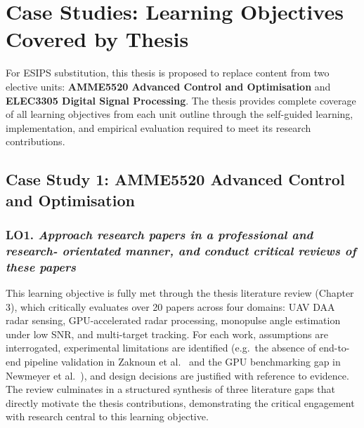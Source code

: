 \section*{Case Studies: Learning Objectives Covered by Thesis}

For ESIPS substitution, this thesis is proposed to replace content from two elective
units: \textbf{AMME5520 Advanced Control and Optimisation} and \textbf{ELEC3305 Digital
Signal Processing}. The thesis provides complete coverage of all learning objectives from
each unit outline through the self-guided learning, implementation, and empirical
evaluation required to meet its research contributions.

\subsection*{Case Study 1: AMME5520 Advanced Control and Optimisation}

\subsubsection*{LO1. \emph{Approach research papers in a professional and research-
orientated manner, and conduct critical reviews of these papers}}
This learning objective is fully met through the thesis literature review (Chapter 3),
which critically evaluates over 20 papers across four domains: UAV DAA radar sensing,
GPU-accelerated radar processing, monopulse angle estimation under low SNR, and
multi-target tracking. For each work, assumptions are interrogated, experimental
limitations are identified (e.g.\ the absence of end-to-end pipeline validation in
Zaknoun et al.\ \cite{zaknoun2024_realtime_gpu_accelerated_radar_processing} 
and the GPU benchmarking gap in Newmeyer et al.\ \cite{7577322}), and design decisions
are justified with reference to evidence. The review culminates in a structured
synthesis of three literature gaps that directly motivate the thesis contributions,
demonstrating the critical engagement with research central to this learning objective.

